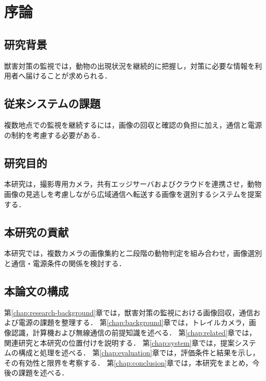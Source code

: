 \chapter{序論}
\label{chap:introduction}

\section{研究背景}
獣害対策の監視では，動物の出現状況を継続的に把握し，対策に必要な情報を利用者へ届けることが求められる．

\section{従来システムの課題}
複数地点での監視を継続するには，画像の回収と確認の負担に加え，通信と電源の制約を考慮する必要がある．

\section{研究目的}
本研究は，撮影専用カメラ，共有エッジサーバおよびクラウドを連携させ，動物画像の見逃しを考慮しながら広域通信へ転送する画像を選別するシステムを提案する．

\section{本研究の貢献}
本研究では，複数カメラの画像集約と二段階の動物判定を組み合わせ，画像選別と通信・電源条件の関係を検討する．

\section{本論文の構成}
第\ref{chap:research-background}章では，獣害対策の監視における画像回収，通信および電源の課題を整理する．
第\ref{chap:background}章では，トレイルカメラ，画像認識，計算機および無線通信の前提知識を述べる．
第\ref{chap:related}章では，関連研究と本研究の位置付けを説明する．
第\ref{chap:system}章では，提案システムの構成と処理を述べる．
第\ref{chap:evaluation}章では，評価条件と結果を示し，その有効性と限界を考察する．
第\ref{chap:conclusion}章では，本研究をまとめ，今後の課題を述べる．
